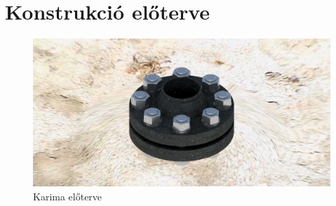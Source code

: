 \section{Konstrukció előterve}


\begin{figure}[hbt!]
	\centering
	\includegraphics[scale=.1]{./images/assembly.png}
	\caption{Karima előterve}
\end{figure}
